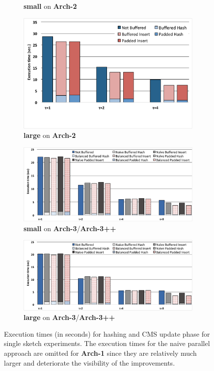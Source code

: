 \documentclass[10pt, review=true,sigconf]{acmart}
\begin{document}
\begin{figure}[htbp]
\begin{subfigure}[t]{0.43\textwidth}
\caption{{\bf small} on {\bf Arch-2}}
\label{fig:8x211arch2}
\end{subfigure}
\begin{subfigure}[t]{0.43\textwidth}
\includegraphics[width=\linewidth]{expfigs/large-rpi.pdf}
\caption{{\bf large} on {\bf Arch-2}}
\label{fig:8x2003arch2}
\end{subfigure}
\begin{subfigure}[t]{0.6\textwidth}
	\includegraphics[width=\linewidth]{expfigs/small-odroid.pdf}
	\caption{{\bf small} on {\bf Arch-3}/{\bf{Arch-3++}}}
	\label{fig:8x211arch3}
\end{subfigure}
\begin{subfigure}[t]{0.6\textwidth}
	\includegraphics[width=\linewidth]{expfigs/large-odroid.pdf}
	\caption{{\bf large} on {\bf Arch-3}/{\bf{Arch-3++}}}
	\label{fig:8x2003arch3}
\end{subfigure}

\caption{Execution times (in seconds) for hashing and CMS update phase for single sketch experiments. The execution times for the naive parallel approach are omitted for {\bf Arch-1} since they are relatively much larger and deteriorate the visibility of the improvements.}
\label{fig:sum}
\end{figure}
\end{document}
